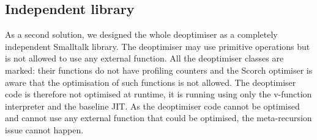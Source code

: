\documentclass[a4paper,12pt,twoside]{../includes/ThesisStyle}
\begin{document}
\subsection{Independent library}
\label{sec:independentLib}

As a second solution, we designed the whole deoptimiser as a completely independent Smalltalk library. The deoptimiser may use primitive operations but is not allowed to use any external function. All the deoptimiser classes are marked: their functions do not have profiling counters and the Scorch optimiser is aware that the optimisation of such functions is not allowed. The deoptimiser code is therefore not optimised at runtime, it is running using only the v-function interpreter and the baseline JIT. As the deoptimiser code cannot be optimised and cannot use any external function that could be optimised, the meta-recursion issue cannot happen.
\end{document}
